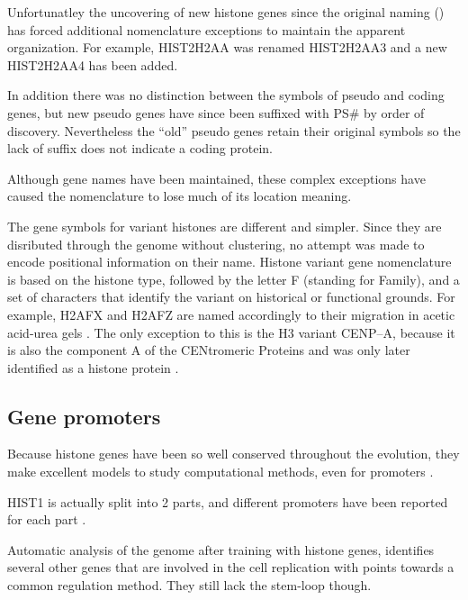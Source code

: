 	Unfortunatley the uncovering of new histone genes since the original naming () 
	has forced additional nomenclature exceptions to maintain the apparent organization.
	For example, HIST2H2AA was renamed HIST2H2AA3 and a new HIST2H2AA4 has been added.
	
	In addition there was no distinction between the symbols of pseudo and coding genes, 
	but new pseudo genes have since been suffixed with PS\# by order of discovery. 
	Nevertheless the ``old'' pseudo genes retain their original symbols 
	so the lack of suffix does not indicate a coding protein.

    Although gene names have been maintained, these complex exceptions have caused the nomenclature 
	to lose much of its location meaning. 

    The gene symbols for variant histones are different and simpler. 
	Since they are disributed through the genome without clustering, 
	no attempt was made to encode positional information on their name.
	Histone variant gene nomenclature is based on the histone type,
    followed by the letter F (standing for Family), 
	and a set of characters that identify the variant on historical or functional grounds. 
	For example, H2AFX and H2AFZ are named accordingly to their migration in acetic acid-urea gels
    \citep{HTwoA-first-variants}.
    The only exception to this is the H3 variant CENP--A, 
	because it is also the component A of the CENtromeric Proteins
	 \cite{CENPA-first-report} and was only later identified as a histone protein \citep{CENPA-copurifies-histones, CENPA-sequence-analysis}.

  \subsection{Gene promoters}

    Because histone genes have been so well conserved throughout the evolution, they make
    excellent models to study computational methods, even for promoters
    \citep{histone-promoter-modeling}.

    HIST1 is actually split into 2 parts, and different promoters have been reported for each
    part \citep{HISTOne-different-transcripts}.

    Automatic analysis of the genome after training with histone genes, identifies
    several other genes that are involved in the cell replication with points
    towards a common regulation method. They still lack the stem-loop though.

